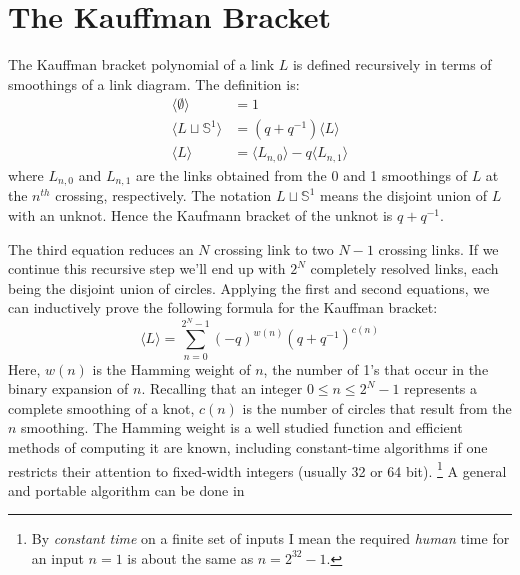 \documentclass{article}
\theoremstyle{plain}
\begin{document}
    \section{The Kauffman Bracket}
        The Kauffman bracket polynomial of a link $L$ is defined recursively
        in terms of smoothings of a link diagram. The definition is:
        \begin{align}
            \langle\emptyset\rangle&=1\\
            \langle{L\sqcup\mathbb{S}^{1}}\rangle&=(q+q^{-1})\langle{L}\rangle\\
            \langle{L}\rangle&=
                \langle{L_{n,0}}\rangle-q\langle{L_{n,1}}\rangle
        \end{align}
        where $L_{n,0}$ and $L_{n,1}$ are the links obtained from the
        0 and 1 smoothings of $L$ at the $n^{th}$ crossing, respectively. The
        notation $L\sqcup\mathbb{S}^{1}$ means the disjoint union of
        $L$ with an unknot. Hence the Kaufmann bracket of the
        unknot is $q+q^{-1}$.
        \par\hfill\par
        The third equation reduces an $N$ crossing link to two $N-1$ crossing
        links. If we continue this recursive step we'll end up with
        $2^{N}$ completely resolved links, each being the disjoint union of
        circles. Applying the first and second equations, we can inductively
        prove the following formula for the Kauffman bracket:
        \begin{equation}
            \label{eqn:kauffman_bracket}%
            \langle{L}\rangle=\sum_{n=0}^{2^{N}-1}
                (-q)^{w(n)}(q+q^{-1})^{c(n)}
        \end{equation}
        Here, $w(n)$ is the Hamming weight of $n$, the number of 1's
        that occur in the binary expansion of $n$. Recalling that an integer
        $0\leq{n}\leq{2}^{N}-1$ represents a complete smoothing of a knot,
        $c(n)$ is the number of circles that result from the $n$ smoothing.
        The Hamming weight is a well studied function and efficient methods of
        computing it are known, including constant-time algorithms if one
        restricts their attention to fixed-width integers
        (usually 32 or 64 bit).%
        \footnote{
            By \textit{constant time} on a finite set of inputs I mean the
            required \textit{human} time for an input $n=1$ is about the same
            as $n=2^{32}-1$.
        }
        A general and portable algorithm can be done in
\end{document}

